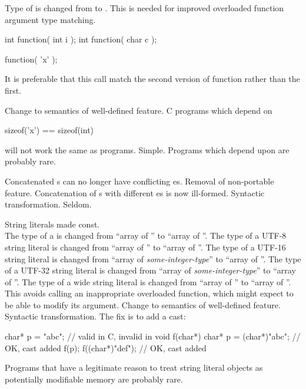 \change
Type of  is changed from  to .
\rationale
This is needed for improved overloaded function argument type
matching.
\begin{example}
\begin{codeblock}
int function( int i );
int function( char c );

function( 'x' );
\end{codeblock}
It is preferable that this call match the second version of
function rather than the first.
\end{example}
\effect
Change to semantics of well-defined feature.
C programs which depend on
\begin{codeblock}
sizeof('x') == sizeof(int)
\end{codeblock}
will not work the same as \Cpp{} programs.
\difficulty
Simple.
\howwide
Programs which depend upon  are probably rare.

\change
Concatenated s can no longer have
conflicting es.
\rationale
Removal of non-portable feature.
\effect
Concatenation of s
with different es
is now ill-formed.
\difficulty
Syntactic transformation.
\howwide
Seldom.

\change
String literals made const.\\
The type of a  is changed
from ``array of ''
to ``array of ''.
%
The type of a UTF-8 string literal is changed
from ``array of ''
to ``array of ''.
%
The type of a UTF-16 string literal is changed
from ``array of \textit{some-integer-type}''
to ``array of ''.
%
The type of a UTF-32 string literal is changed
from ``array of \textit{some-integer-type}''
to ``array of ''.
The type of a wide string literal is changed
from ``array of ''
to ``array of ''.
\rationale
This avoids calling an inappropriate overloaded function,
which might expect to be able to modify its argument.
\effect
Change to semantics of well-defined feature.
\difficulty
Syntactic transformation. The fix is to add a cast:
\begin{codeblock}
char* p = "abc";                // valid in C, invalid in \Cpp{}
void f(char*) {
  char* p = (char*)"abc";       // OK, cast added
  f(p);
  f((char*)"def");              // OK, cast added
}
\end{codeblock}
\howwide
Programs that have a legitimate reason to treat string literal objects
as potentially modifiable memory are probably rare.

